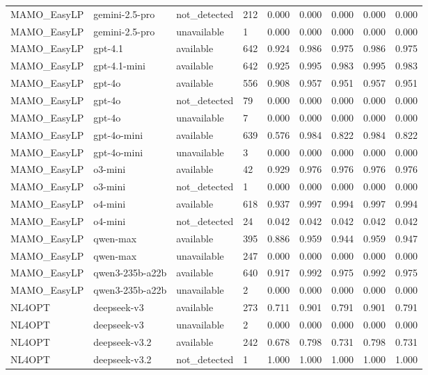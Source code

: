 \begin{table}[t]
\begin{tabular}{lllllllll}
MAMO\_EasyLP & gemini-2.5-pro & not\_detected & 212 & 0.000 & 0.000 & 0.000 & 0.000 & 0.000 \\
MAMO\_EasyLP & gemini-2.5-pro & unavailable & 1 & 0.000 & 0.000 & 0.000 & 0.000 & 0.000 \\
MAMO\_EasyLP & gpt-4.1 & available & 642 & 0.924 & 0.986 & 0.975 & 0.986 & 0.975 \\
MAMO\_EasyLP & gpt-4.1-mini & available & 642 & 0.925 & 0.995 & 0.983 & 0.995 & 0.983 \\
MAMO\_EasyLP & gpt-4o & available & 556 & 0.908 & 0.957 & 0.951 & 0.957 & 0.951 \\
MAMO\_EasyLP & gpt-4o & not\_detected & 79 & 0.000 & 0.000 & 0.000 & 0.000 & 0.000 \\
MAMO\_EasyLP & gpt-4o & unavailable & 7 & 0.000 & 0.000 & 0.000 & 0.000 & 0.000 \\
MAMO\_EasyLP & gpt-4o-mini & available & 639 & 0.576 & 0.984 & 0.822 & 0.984 & 0.822 \\
MAMO\_EasyLP & gpt-4o-mini & unavailable & 3 & 0.000 & 0.000 & 0.000 & 0.000 & 0.000 \\
MAMO\_EasyLP & o3-mini & available & 42 & 0.929 & 0.976 & 0.976 & 0.976 & 0.976 \\
MAMO\_EasyLP & o3-mini & not\_detected & 1 & 0.000 & 0.000 & 0.000 & 0.000 & 0.000 \\
MAMO\_EasyLP & o4-mini & available & 618 & 0.937 & 0.997 & 0.994 & 0.997 & 0.994 \\
MAMO\_EasyLP & o4-mini & not\_detected & 24 & 0.042 & 0.042 & 0.042 & 0.042 & 0.042 \\
MAMO\_EasyLP & qwen-max & available & 395 & 0.886 & 0.959 & 0.944 & 0.959 & 0.947 \\
MAMO\_EasyLP & qwen-max & unavailable & 247 & 0.000 & 0.000 & 0.000 & 0.000 & 0.000 \\
MAMO\_EasyLP & qwen3-235b-a22b & available & 640 & 0.917 & 0.992 & 0.975 & 0.992 & 0.975 \\
MAMO\_EasyLP & qwen3-235b-a22b & unavailable & 2 & 0.000 & 0.000 & 0.000 & 0.000 & 0.000 \\
NL4OPT & deepseek-v3 & available & 273 & 0.711 & 0.901 & 0.791 & 0.901 & 0.791 \\
NL4OPT & deepseek-v3 & unavailable & 2 & 0.000 & 0.000 & 0.000 & 0.000 & 0.000 \\
NL4OPT & deepseek-v3.2 & available & 242 & 0.678 & 0.798 & 0.731 & 0.798 & 0.731 \\
NL4OPT & deepseek-v3.2 & not\_detected & 1 & 1.000 & 1.000 & 1.000 & 1.000 & 1.000 \\

\end{tabular}
\end{table}
